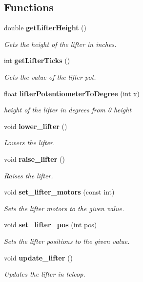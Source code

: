 \subsection*{Functions}
\begin{DoxyCompactItemize}
\item 
double \textbf{ get\+Lifter\+Height} ()
\begin{DoxyCompactList}\small\item\em Gets the height of the lifter in inches. \end{DoxyCompactList}\item 
int \textbf{ get\+Lifter\+Ticks} ()
\begin{DoxyCompactList}\small\item\em Gets the value of the lifter pot. \end{DoxyCompactList}\item 
float \textbf{ lifter\+Potentiometer\+To\+Degree} (int x)
\begin{DoxyCompactList}\small\item\em height of the lifter in degrees from 0 height \end{DoxyCompactList}\item 
void \textbf{ lower\+\_\+lifter} ()
\begin{DoxyCompactList}\small\item\em Lowers the lifter. \end{DoxyCompactList}\item 
void \textbf{ raise\+\_\+lifter} ()
\begin{DoxyCompactList}\small\item\em Raises the lifter. \end{DoxyCompactList}\item 
void \textbf{ set\+\_\+lifter\+\_\+motors} (const int)
\begin{DoxyCompactList}\small\item\em Sets the lifter motors to the given value. \end{DoxyCompactList}\item 
void \textbf{ set\+\_\+lifter\+\_\+pos} (int pos)
\begin{DoxyCompactList}\small\item\em Sets the lifter positions to the given value. \end{DoxyCompactList}\item 
void \textbf{ update\+\_\+lifter} ()
\begin{DoxyCompactList}\small\item\em Updates the lifter in teleop. \end{DoxyCompactList}\end{DoxyCompactItemize}


